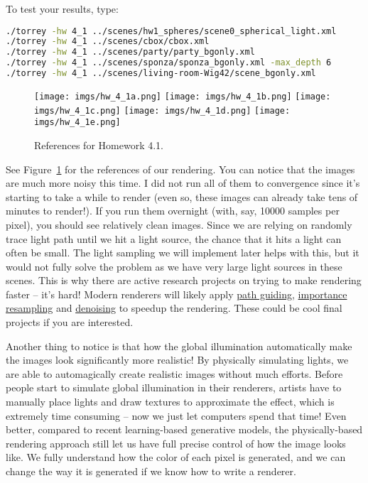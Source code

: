 To test your results, type:
\begin{lstlisting}[language=bash]
./torrey -hw 4_1 ../scenes/hw1_spheres/scene0_spherical_light.xml
./torrey -hw 4_1 ../scenes/cbox/cbox.xml
./torrey -hw 4_1 ../scenes/party/party_bgonly.xml
./torrey -hw 4_1 ../scenes/sponza/sponza_bgonly.xml -max_depth 6
./torrey -hw 4_1 ../scenes/living-room-Wig42/scene_bgonly.xml
\end{lstlisting}

\begin{figure}[ht]
    \centering
    \texttt{[image: imgs/hw\_4\_1a.png]}
    \texttt{[image: imgs/hw\_4\_1b.png]}
    \texttt{[image: imgs/hw\_4\_1c.png]}
    \texttt{[image: imgs/hw\_4\_1d.png]}
    \texttt{[image: imgs/hw\_4\_1e.png]}
    \caption{References for Homework 4.1.}
    \label{fig:hw_4_1}
\end{figure}

See Figure~\ref{fig:hw_4_1} for the references of our rendering. 
You can notice that the images are much more noisy this time. I did not run all of them to convergence since it's starting to take a while to render (even so, these images can already take tens of minutes to render!). If you run them overnight (with, say, 10000 samples per pixel), you should see relatively clean images. Since we are relying on randomly trace light path until we hit a light source, the chance that it hits a light can often be small. The light sampling we will implement later helps with this, but it would not fully solve the problem as we have very large light sources in these scenes. This is why there are active research projects on trying to make rendering faster -- it's hard! Modern renderers will likely apply \href{https://cgg.mff.cuni.cz/~jirka/path-guiding-in-production/2019/index.htm}{path guiding}, \href{https://cs.dartmouth.edu/~wjarosz/publications/bitterli20spatiotemporal.html}{importance resampling} and \href{https://www.cmlab.csie.ntu.edu.tw/project/sbf/}{denoising} to speedup the rendering. These could be cool final projects if you are interested.

Another thing to notice is that how the global illumination automatically make the images look significantly more realistic! By physically simulating lights, we are able to automagically create realistic images without much efforts. Before people start to simulate global illumination in their renderers, artists have to manually place lights and draw textures to approximate the effect, which is extremely time consuming -- now we just let computers spend that time! Even better, compared to recent learning-based generative models, the physically-based rendering approach still let us have full precise control of how the image looks like. We fully understand how the color of each pixel is generated, and we can change the way it is generated if we know how to write a renderer.

